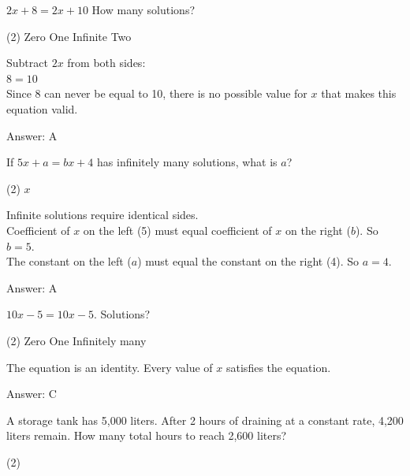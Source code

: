 \documentclass[11pt,paper=a4,answers]{exam}
\begin{document}
\begin{questions}
\question
$2x + 8 = 2x + 10$
How many solutions?
\begin{tasks}(2)
    \task Zero
    \task One
    \task Infinite
    \task Two
\end{tasks}

\begin{solution}
Subtract $2x$ from both sides:
\\[10pt]
$8 = 10$ 
\\[10pt]
Since 8 can never be equal to 10, there is no possible value for $x$ that makes this equation valid.

\vspace{20pt}
Answer: \colorbox{yellow!100}{A}
\end{solution}

\question
If $5x + a = bx + 4$ has infinitely many solutions, what is $a$?
\begin{tasks}(2)
    \task $x$
\end{tasks}

\begin{solution}
Infinite solutions require identical sides. 
\\[10pt]
Coefficient of $x$ on the left (5) must equal coefficient of $x$ on the right ($b$). So $b = 5$. 
\\[10pt]
The constant on the left ($a$) must equal the constant on the right (4). So $a = 4$.

\vspace{20pt}
Answer: \colorbox{yellow!100}{A}
\end{solution}

\question
$10x - 5 = 10x - 5$. Solutions?
\begin{tasks}(2)
    \task Zero
    \task One
    \task Infinitely many
\end{tasks}

\begin{solution}
The equation is an identity. Every value of $x$ satisfies the equation.

\vspace{20pt}
Answer: \colorbox{yellow!100}{C}
\end{solution}
\question
A storage tank has 5,000 liters. After 2 hours of draining at a constant rate, 4,200 liters remain. How many total hours to reach 2,600 liters?
\begin{tasks}(2)
\end{tasks}


\end{questions}
\end{document}
